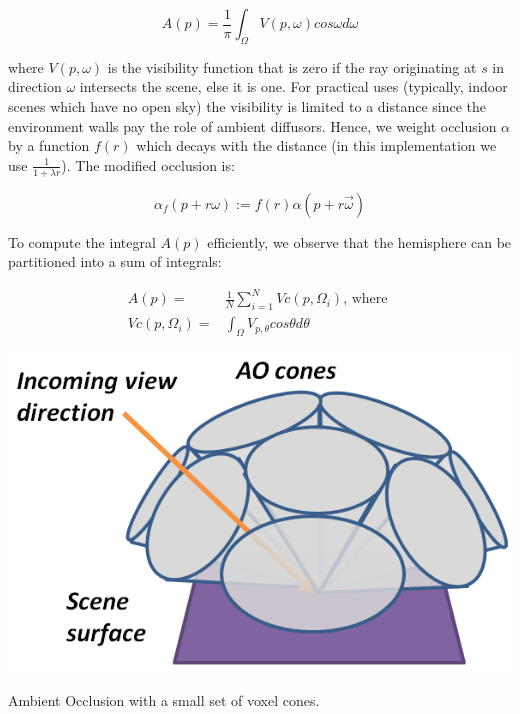 \begin{equation*}
	A(p)=\frac{1}{\pi}\int_\Omega V(p,\omega)cos\omega d\omega
\end{equation*}

where $V(p,\omega)$ is the visibility function that is zero if the ray originating at $s$ in direction $\omega$ intersects the scene, else it is one. For practical uses (typically, indoor scenes which have no open sky) the visibility is limited to a distance since the environment walls pay the role of ambient diffusors. Hence, we weight occlusion $\alpha$ by a function $f(r)$ which decays with the distance (in this implementation we use $\frac{1}{1+\lambda r}$). The modified occlusion is:

\begin{equation*}
	\alpha_f(p+r\omega):=f(r)\alpha(p+r\vec{\omega})
\end{equation*}

To compute the integral $A(p)$ efficiently, we observe that the hemisphere can be partitioned into a sum of integrals: 

\begin{equation*}
\begin{aligned}
	A(p)=&\frac{1}{N}\sum^{N}_{i=1}Vc(p,\Omega_i)\text{, where }\\
	Vc(p,\Omega_i)=&\int_{\Omega}V_{p,\theta}cos\theta d\theta
\end{aligned}
\end{equation*}

\begin{marginfigure}
	\includegraphics{graphics/vct/vct-14-1}
	\caption{Ambient Occlusion with a small set of voxel cones.}
	\label{f:vct-ao}
\end{marginfigure}

